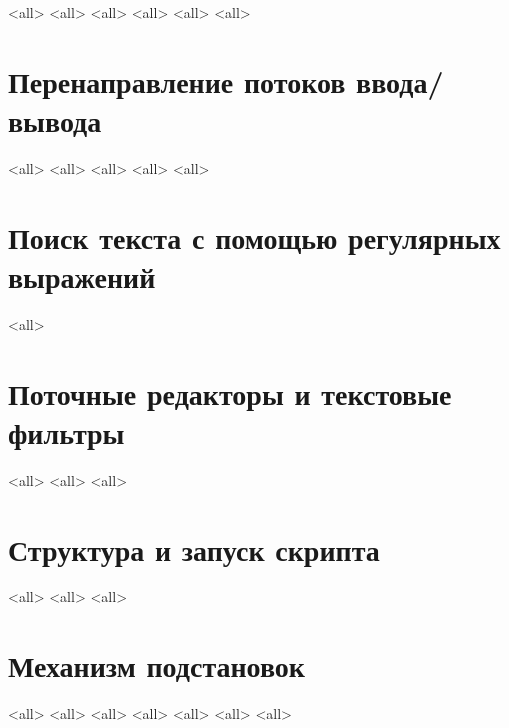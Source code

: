 \mode<all>{}
\mode<all>{       }
\mode<all>{}
\mode<all>{}
\mode<all>{}
\mode<all>{}

\section{Перенаправление потоков ввода/вывода}
\mode<all>{}
\mode<all>{}
\mode<all>{}
\mode<all>{}
\mode<all>{}

\section{Поиск текста с помощью регулярных выражений}
\mode<all>{}
\section{Поточные редакторы и текстовые фильтры}
\mode<all>{} %
\mode<all>{}
\mode<all>{}


\section{ Структура и запуск скрипта }
\mode<all>{}
\mode<all>{}
\mode<all>{}


\section{ Механизм подстановок }
\mode<all>{}
\mode<all>{}
\mode<all>{}
\mode<all>{}
\mode<all>{}
\mode<all>{}
\mode<all>{}

